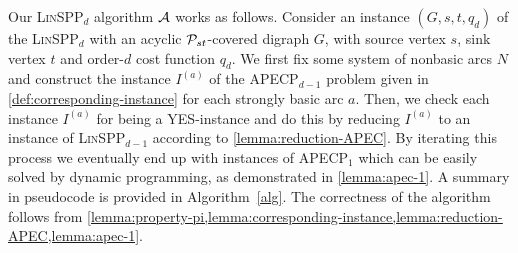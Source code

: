 Our \textsc{Lin}SPP$_d$ algorithm ${\cal A}$ works as follows.
Consider an instance $(G,s,t,q_d)$ of the \textsc{Lin}SPP$_d$ with an acyclic $\mathcal{P}_{st}$-covered digraph $G$, with source vertex $s$, sink vertex $t$ and order-$d$ cost function $q_d$. We first fix some system of nonbasic arcs $N$ and construct the instance $I^{(a)}$ of the  APECP$_{d-1}$ problem given in \cref{def:corresponding-instance} for each strongly basic arc $a$. 
Then,  we  check each instance  $I^{(a)}$ for being a  \textsc{YES}-instance and
do this by reducing  $I^{(a)}$  to  an instance of \textsc{Lin}SPP$_{d-1}$ according to \cref{lemma:reduction-APEC}.
By iterating this process we eventually end up with instances of APECP$_1$  which  can be easily solved by  dynamic programming, as demonstrated in \cref{lemma:apec-1}. A summary in pseudocode is provided in Algorithm~\ref{alg}. The correctness of the algorithm follows from \cref{lemma:property-pi,lemma:corresponding-instance,lemma:reduction-APEC,lemma:apec-1}.


